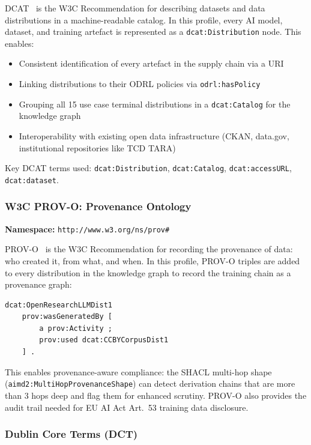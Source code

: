\documentclass[12pt,a4paper]{article}
\begin{document}
DCAT~\cite{dcat3} is the W3C Recommendation for describing datasets and data distributions in a machine-readable catalog. In this profile, every AI model, dataset, and training artefact is represented as a \texttt{dcat:Distribution} node. This enables:

\begin{itemize}[noitemsep]
  \item Consistent identification of every artefact in the supply chain via a URI
  \item Linking distributions to their ODRL policies via \texttt{odrl:hasPolicy}
  \item Grouping all 15 use case terminal distributions in a \texttt{dcat:Catalog} for the knowledge graph
  \item Interoperability with existing open data infrastructure (CKAN, data.gov, institutional repositories like TCD TARA)
\end{itemize}

Key DCAT terms used: \texttt{dcat:Distribution}, \texttt{dcat:Catalog}, \texttt{dcat:accessURL}, \texttt{dcat:dataset}.

\subsubsection{W3C PROV-O: Provenance Ontology}

\textbf{Namespace:} \texttt{http://www.w3.org/ns/prov\#}

PROV-O~\cite{provo} is the W3C Recommendation for recording the provenance of data: who created it, from what, and when. In this profile, PROV-O triples are added to every distribution in the knowledge graph to record the training chain as a provenance graph:

\begin{lstlisting}
dcat:OpenResearchLLMDist1
    prov:wasGeneratedBy [
        a prov:Activity ;
        prov:used dcat:CCBYCorpusDist1
    ] .
\end{lstlisting}

This enables provenance-aware compliance: the SHACL multi-hop shape  \linebreak (\texttt{aimd2:MultiHopProvenanceShape}) can detect derivation chains that are more than 3 hops deep and flag them for enhanced scrutiny. PROV-O also provides the audit trail needed for EU AI Act Art.\ 53 training data disclosure.

\subsubsection{Dublin Core Terms (DCT)}
\end{document}
